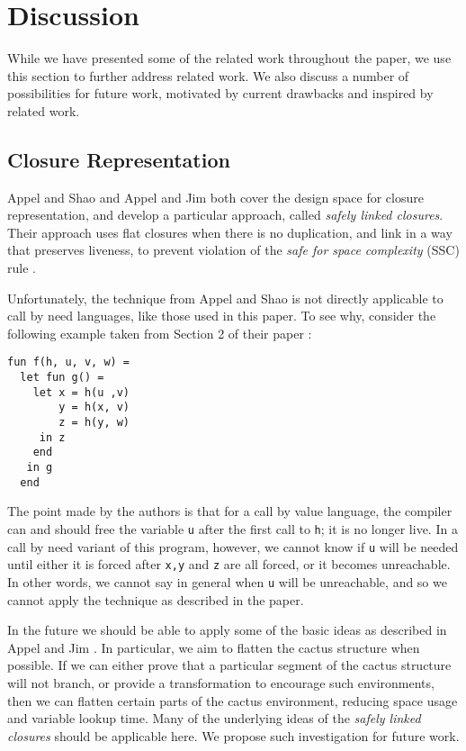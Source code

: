 \section{Discussion} \label{sec:disc}

While we have presented some of the related work throughout the paper, we use
this section to further address related work. We also discuss a number of
possibilities for future work, motivated by current drawbacks and inspired by
related work. 

\subsection{Closure Representation}

Appel and Shao \cite{shao1994space} and Appel and Jim \cite{appel1988optimizing}
both cover the design space for closure representation, and develop a particular
approach, called \emph{safely linked closures}. Their approach uses flat
closures when there is no duplication, and link in a way that preserves
liveness, to prevent violation of the \emph{safe for space complexity} (SSC)
rule \cite{appel2006compiling}.

Unfortunately, the technique from Appel and Shao is not directly applicable to
call by need languages, like those used in this paper. To see why, consider the
following example taken from Section 2 of their paper
\cite{appel1988optimizing}:
\begin{verbatim}
fun f(h, u, v, w) = 
  let fun g() = 
    let x = h(u ,v)
        y = h(x, v)
        z = h(y, w)
     in z
    end
   in g
  end
\end{verbatim}
The point made by the authors is that for a call by value language, the compiler
can and should free the variable \texttt{u} after the first call to \texttt{h};
it is no longer live. In a call by need variant of this program, however, we
cannot know if \texttt{u} will be needed until either it is forced after
\texttt{x,y} and \texttt{z} are all forced, or it becomes unreachable. In other
words, we cannot say in general when \texttt{u} will be unreachable, and so we
cannot apply the technique as described in the paper.

In the future we should be able to apply some of the basic ideas as described in
Appel and Jim \cite{appel1988optimizing}. In particular, we aim to flatten the
cactus structure when possible. If we can either prove that a particular segment
of the cactus structure will not branch, or provide a transformation to
encourage such environments, then we can flatten certain parts of the cactus
environment, reducing space usage and variable lookup time. Many of the
underlying ideas of the \emph{safely linked closures} \cite{shao1994space}
should be applicable here. We propose such investigation for future work.

